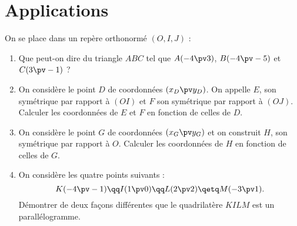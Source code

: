 \documentclass[10pt,openright,twoside,french]{book}
\begin{document}
\section{Applications}
\begin{Exemple}[s]
On se place dans un repère orthonormé $(O,I,J)$ :
\begin{enumerate}
    \item Que peut-on dire du triangle $ABC$ tel que $A(-4 \pv 3)$, $B(-4\pv-5)$ et $C(3\pv-1)$ ?
    \item On considère le point $D$ de coordonnées $(x_D \pv y_D)$. On appelle $E$, son symétrique par rapport à $(OI)$ et $F$ son symétrique par rapport à $(OJ)$. Calculer les coordonnées de $E$ et $F$ en fonction de celles de $D$.
    \item On considère le point $G$ de coordonnées $(x_G \pv y_G)$ et on construit $H$, son symétrique par rapport à $O$. Calculer les coordonnées de $H$ en fonction de celles de $G$.
    \item On considère les quatre points suivants :
    \[K(-4\pv -1) \qq I(1 \pv 0) \qq L(2\pv2) \qetq M(-3\pv1).\]
    Démontrer de deux façons différentes que le quadrilatère $KILM$ est un parallélogramme.
\end{enumerate}
\end{Exemple}
\end{document}

